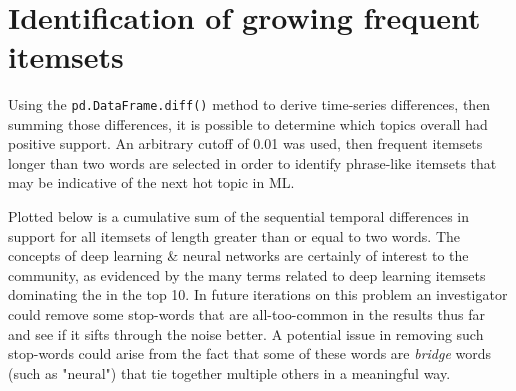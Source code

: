 \documentclass[11pt]{article}
\begin{document}
    \begin{center}
    \end{center}
    { \hspace*{\fill} \\}
    
    \section{Identification of growing frequent
itemsets}\label{identification-of-growing-frequent-itemsets}

Using the \texttt{pd.DataFrame.diff()} method to derive time-series
differences, then summing those differences, it is possible to determine
which topics overall had positive support. An arbitrary cutoff of 0.01
was used, then frequent itemsets longer than two words are selected in
order to identify phrase-like itemsets that may be indicative of the
next hot topic in ML.

Plotted below is a cumulative sum of the sequential temporal differences
in support for all itemsets of length greater than or equal to two
words. The concepts of deep learning \& neural networks are certainly of
interest to the community, as evidenced by the many terms related to
deep learning itemsets dominating the in the top 10. In future
iterations on this problem an investigator could remove some stop-words
that are all-too-common in the results thus far and see if it sifts
through the noise better. A potential issue in removing such stop-words
could arise from the fact that some of these words are \emph{bridge}
words (such as "neural") that tie together multiple others in a
meaningful way.
\end{document}
